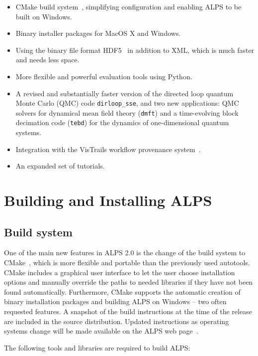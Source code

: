 \documentclass[12pt]{iopart}
\begin{document}
 
 \begin{itemize}
\item CMake build system~\cite{cmake}, simplifying configuration and enabling ALPS to be built on Windows.
\item Binary installer packages for MacOS X and Windows.
\item Using the binary file format HDF5~\cite{hdf5} in addition to XML, which is much faster and needs less space.
\item More flexible and powerful evaluation tools using Python.
\item A revised and substantially faster version of the directed loop quantum Monte Carlo (QMC) code {\tt dirloop\_sse}, and two new applications: QMC solvers for dynamical 
mean field theory ({\tt dmft}) and a time-evolving block decimation code ({\tt tebd}) for the dynamics of one-dimensional quantum systems.
\item Integration with the VisTrails workflow provenance system~\cite{vistrails}.
\item An expanded set of tutorials.
 \end{itemize}
 
 
\section{Building and Installing ALPS}
\subsection{Build system}
One of the main new features in ALPS 2.0 is the change of the build system to CMake~\cite{cmake}, which is more flexible and portable than the previously used autotools. CMake includes a graphical user interface to let the user choose installation options and manually override the paths to needed libraries if they have not been found automatically. Furthermore, CMake supports the automatic creation of binary installation packages and building ALPS on Windows -- two often requested features. A snapshot of the build instructions at the time of the release are included in the source distribution. Updated instructions as operating systems change will be made available on the ALPS web page~\cite{alps}.

The following tools and libraries are required to build ALPS:
\end{document}
